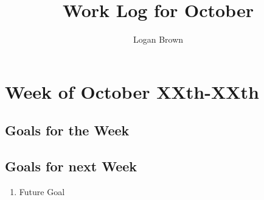 

\title{Work Log for October}
\author{Logan Brown}


\maketitle


\setcounter{section}{0} %
\setcounter{subsection}{-1}
\setcounter{subsubsection}{0}

\section{Week of October XXth-XXth}
\subsection{Goals for the Week}



\subsection{Goals for next Week}
\begin{enumerate}
\item Future Goal
\end{enumerate}


